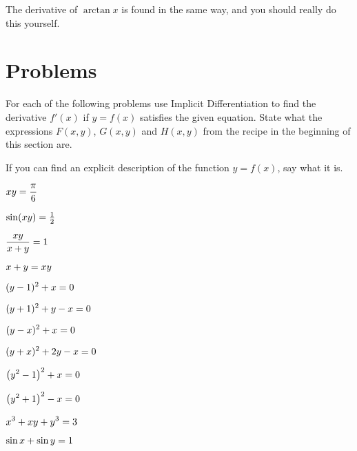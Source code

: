The derivative of $\arctan x$ is found in the same way, and you should
really do this yourself.




\section{Problems} 
\problemfont 




\begin{multicols}{2}
\setlength{\parindent}{0pt}
For each of the following problems use Implicit Differentiation to
find the derivative $f'(x)$ if $y=f(x)$ satisfies the given equation.
State what the expressions $F(x, y)$, $G(x, y)$ and $H(x, y)$ from the
recipe in the beginning of this section are.




If you can find an explicit description of the function $y=f(x)$, say
what it is.












\problem $\displaystyle xy=\frac\pi6$ 




\problem $\displaystyle \sin(xy)=\tfrac12 $ 




\problem $\displaystyle \frac{xy}{x+y}=1 $ 




\problem $\displaystyle x+y=xy $ 




\problem $\displaystyle (y-1)^2 + x = 0$ 




\problem $\displaystyle (y+1)^2 + y - x = 0$ 




\problem $\displaystyle (y-x)^2 + x = 0$ 




\problem $\displaystyle (y+x)^2 + 2y - x = 0$ 




\problem $\displaystyle \bigl(y^2-1 \bigr)^2 + x = 0$ 




\problem $\displaystyle \bigl(y^2+1 \bigr)^2 - x = 0$ 




\problem $\displaystyle x^3+xy+y^3=3 $ 




\problem $\displaystyle \sin x +\sin y = 1 $ 





\end{multicols}
